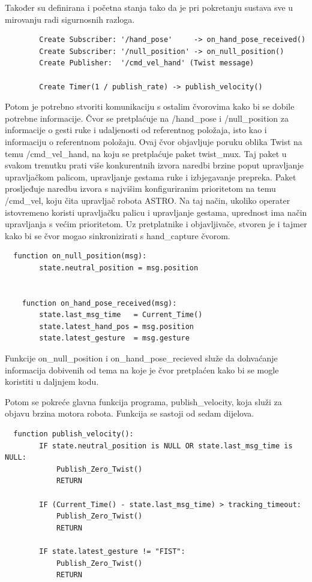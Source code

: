 \documentclass[12pt,a4paper,oneside]{report}
\begin{document}
Također su definirana i početna stanja tako da je pri pokretanju sustava sve u mirovanju radi sigurnosnih razloga. 

\begin{verbatim}
        Create Subscriber: '/hand_pose'     -> on_hand_pose_received()
        Create Subscriber: '/null_position' -> on_null_position()
        Create Publisher:  '/cmd_vel_hand' (Twist message)

        Create Timer(1 / publish_rate) -> publish_velocity()
\end{verbatim}

Potom je potrebno stvoriti komunikaciju s ostalim čvorovima kako bi se dobile potrebne informacije. 
Čvor se pretplaćuje na /hand\_pose i /null\_position za informacije o gesti ruke i udaljenosti od referentnog 
položaja, isto kao i informaciju o referentnom položaju. 
Ovaj čvor objavljuje poruku oblika Twist na temu /cmd\_vel\_hand, na koju se pretplaćuje paket twist\_mux. 
Taj paket u svakom trenutku prati više konkurentnih izvora naredbi brzine poput upravljanje upravljačkom palicom, 
upravljanje gestama ruke i izbjegavanje prepreka. Paket prosljeđuje naredbu izvora s najvišim 
konfiguriranim prioritetom na temu /cmd\_vel, koju čita upravljač robota ASTRO. Na taj način, ukoliko 
operater istovremeno koristi upravljačku palicu i upravljanje gestama, uprednost ima način upravljanja s većim 
prioritetom. 
Uz pretplatnike i objavljivače, stvoren je i tajmer kako bi se čvor mogao sinkronizirati s hand\_capture čvorom. 

\begin{verbatim}
  function on_null_position(msg):
        state.neutral_position = msg.position


    function on_hand_pose_received(msg):
        state.last_msg_time   = Current_Time()
        state.latest_hand_pos = msg.position
        state.latest_gesture  = msg.gesture
\end{verbatim}

Funkcije on\_null\_position i on\_hand\_pose\_recieved služe da dohvaćanje informacija dobivenih od tema na koje 
je čvor pretplaćen kako bi se mogle koristiti u daljnjem kodu. 

Potom se pokreće glavna funkcija programa, publish\_velocity, koja služi za objavu brzina motora robota. 
Funkcija se sastoji od sedam dijelova. 

\begin{verbatim}
  function publish_velocity():
        IF state.neutral_position is NULL OR state.last_msg_time is NULL:
            Publish_Zero_Twist()
            RETURN

        IF (Current_Time() - state.last_msg_time) > tracking_timeout:
            Publish_Zero_Twist()
            RETURN

        IF state.latest_gesture != "FIST":
            Publish_Zero_Twist()
            RETURN
\end{verbatim}
\end{document}
